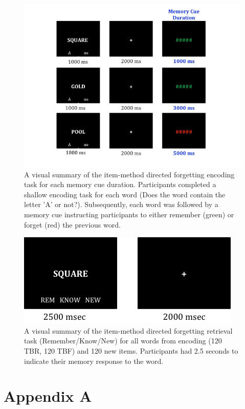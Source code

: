 \documentclass[man]{apa6}
\begin{document}
\begin{figure}
    \centering
    \includegraphics[width=\textwidth]{Slide1.jpg}
    \caption{A visual summary of the item-method directed forgetting encoding task for each memory cue duration. Participants completed a shallow encoding task for each word (Does the word contain the letter 'A' or not?). Subsequently, each word was followed by a memory cue instructing participants to either remember (green) or forget (red) the previous word.}
    \label{fig:1}
\end{figure}

\begin{figure}
    \centering
    \includegraphics{Fig2.jpg}
    \caption{A visual summary of the item-method directed forgetting retrieval task (Remember/Know/New) for all words from encoding (120 TBR, 120 TBF) and 120 new items. Participants had 2.5 seconds to indicate their memory response to the word.}
    \label{fig:2}
\end{figure}

\appendix

\section{Appendix A}
\end{document}
